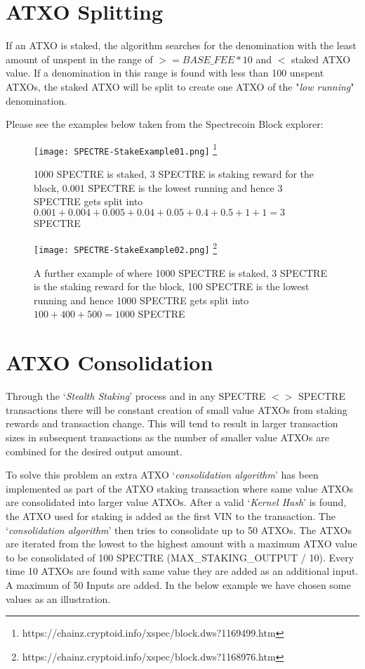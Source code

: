 \section{ATXO Splitting} 
If an ATXO is staked, the algorithm searches for the denomination with the 
least amount of unspent in the range of  $>= BASE\_FEE * 10$ and $<$ staked 
ATXO value. If a denomination in this range is found with less than 100 
unspent ATXOs, the staked ATXO will be split to create one ATXO of the 
"\textit{low running}" denomination. 



Please see the examples below taken from the Spectrecoin Block explorer: 



\begin{figure}[h]
	\caption{1000 SPECTRE is staked, 3 SPECTRE is staking reward for the block, 0.001 SPECTRE is the lowest running and hence 3 SPECTRE gets split into $0.001 + 0.004 + 0.005 + 0.04 + 0.05 + 0.4 + 0.5 + 1 + 1 = 3$ SPECTRE} 
	\centering
	\texttt{[image: SPECTRE-StakeExample01.png]}
	\footnote{https://chainz.cryptoid.info/xspec/block.dws?1169499.htm}
\end{figure}



\begin{figure}[h]
	\caption{A further example of where 1000 SPECTRE is staked, 3 SPECTRE is the staking reward for the block, 100 SPECTRE is the lowest running and hence 1000 SPECTRE gets split into $100 + 400 + 500 = 1000$ SPECTRE}
	\centering
	\texttt{[image: SPECTRE-StakeExample02.png]}
	\footnote{https://chainz.cryptoid.info/xspec/block.dws?1168976.htm} 
\end{figure}



\section{ATXO Consolidation} 
Through the ‘\textit{Stealth Staking}’ process and in any SPECTRE $<>$ 
SPECTRE transactions there will be constant creation of small value ATXOs 
from staking rewards and transaction change. This will tend to result in 
larger transaction sizes in subsequent transactions as the number of 
smaller value ATXOs are combined for the desired output amount. 



To solve this problem an extra ATXO ‘\textit{consolidation algorithm}’ 
has been implemented as part of the ATXO staking transaction where same 
value ATXOs are consolidated into larger value ATXOs. After a valid 
‘\textit{Kernel Hash}’ is found, the ATXO used for staking is added 
as the first VIN to the transaction. The ‘\textit{consolidation algorithm}’ 
then tries to consolidate up to 50 ATXOs. The ATXOs are iterated from the 
lowest to the highest amount with a maximum ATXO value to be consolidated 
of 100 SPECTRE (MAX\_STAKING\_OUTPUT / 10). Every time 10 ATXOs are found 
with same value they are added as an additional input. A maximum of 50 
Inputs are added. In the below example we have chosen some values as an 
illustration. 



